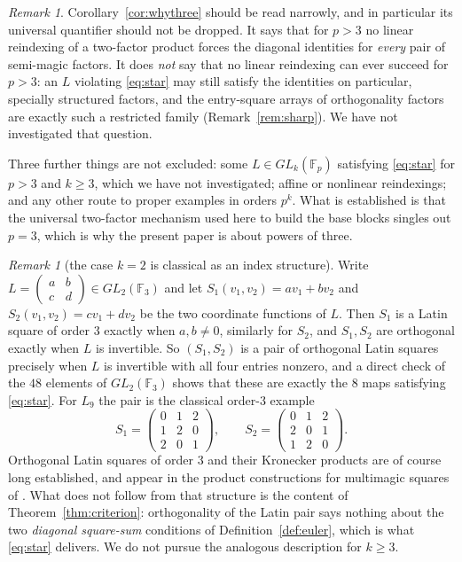 \documentclass[11pt,a4paper]{amsart}
\theoremstyle{plain}
\theoremstyle{definition}
\theoremstyle{remark}
\newtheorem{remark}[theorem]{Remark}
\newcommand{\FF}{\mathbb{F}}
\begin{document}
\begin{remark}\label{rem:scope}
Corollary~\ref{cor:whythree} should be read narrowly, and in particular its
universal quantifier should not be dropped. It says that for $p>3$ no linear
reindexing of a two-factor product forces the diagonal identities for
\emph{every} pair of semi-magic factors. It does \emph{not} say that no linear
reindexing can ever succeed for $p>3$: an $L$ violating \eqref{eq:star} may
still satisfy the identities on particular, specially structured factors, and
the entry-square arrays of orthogonality factors are exactly such a restricted
family (Remark~\ref{rem:sharp}). We have not investigated that question.

Three further things are not excluded: some $L\in GL_k(\FF_p)$ satisfying
\eqref{eq:star} for $p>3$ and $k\ge3$, which we have not investigated; affine
or nonlinear reindexings; and any other route to proper examples in orders
$p^k$. What is established is that the universal two-factor mechanism used here
to build the base blocks singles out $p=3$, which is why the present paper is
about powers of three.
\end{remark}

\begin{remark}[the case $k=2$ is classical as an index structure]\label{rem:mols}
Write $L=\begin{pmatrix}a&b\\c&d\end{pmatrix}\in GL_2(\FF_3)$ and let
$S_1(v_1,v_2)=av_1+bv_2$ and $S_2(v_1,v_2)=cv_1+dv_2$ be the two coordinate
functions of $L$. Then $S_1$ is a Latin square of order $3$ exactly when
$a,b\ne0$, similarly for $S_2$, and $S_1,S_2$ are orthogonal exactly when $L$ is
invertible. So $(S_1,S_2)$ is a pair of orthogonal Latin squares precisely when
$L$ is invertible with all four entries nonzero, and a direct check of the $48$
elements of $GL_2(\FF_3)$ shows that these are exactly the $8$ maps satisfying
\eqref{eq:star}. For $L_9$ the pair is the classical order-$3$ example
\[
S_1=\begin{pmatrix}0&1&2\\1&2&0\\2&0&1\end{pmatrix},\qquad
S_2=\begin{pmatrix}0&1&2\\2&0&1\\1&2&0\end{pmatrix}.
\]
Orthogonal Latin squares of order $3$ and their Kronecker products are of course
long established, and appear in the product constructions for multimagic squares
of \cite{ZhangChenLi2015}. What does not follow from that structure is the
content of Theorem~\ref{thm:criterion}: orthogonality of the Latin pair says
nothing about the two \emph{diagonal square-sum} conditions of
Definition~\ref{def:euler}, which is what \eqref{eq:star} delivers. We do not
pursue the analogous description for $k\ge3$.
\end{remark}
\end{document}
